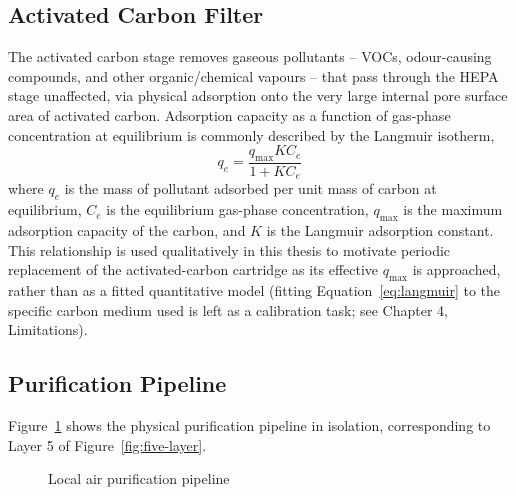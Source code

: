 \subsection{Activated Carbon Filter}
The activated carbon stage removes gaseous pollutants -- VOCs, odour-causing compounds, and other organic/chemical vapours -- that pass through the HEPA stage unaffected, via physical adsorption onto the very large internal pore surface area of activated carbon. Adsorption capacity as a function of gas-phase concentration at equilibrium is commonly described by the Langmuir isotherm,
\begin{equation}
q_e = \frac{q_{\max} K C_e}{1 + K C_e}
\label{eq:langmuir}
\end{equation}
where $q_e$ is the mass of pollutant adsorbed per unit mass of carbon at equilibrium, $C_e$ is the equilibrium gas-phase concentration, $q_{\max}$ is the maximum adsorption capacity of the carbon, and $K$ is the Langmuir adsorption constant. This relationship is used qualitatively in this thesis to motivate periodic replacement of the activated-carbon cartridge as its effective $q_{\max}$ is approached, rather than as a fitted quantitative model (fitting Equation~\ref{eq:langmuir} to the specific carbon medium used is left as a calibration task; see Chapter 4, Limitations).

\subsection{Purification Pipeline}
Figure~\ref{fig:purification-pipeline} shows the physical purification pipeline in isolation, corresponding to Layer 5 of Figure~\ref{fig:five-layer}.

\begin{figure}[htbp]
\centering
{}
\caption{Local air purification pipeline}
\label{fig:purification-pipeline}
\end{figure}


